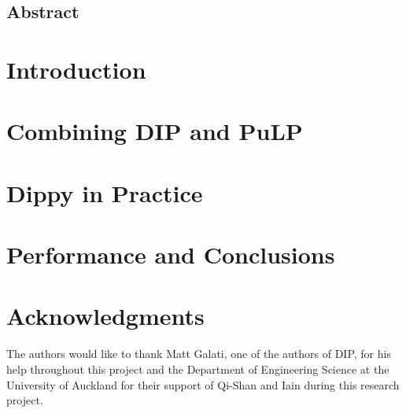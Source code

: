 \documentclass[12pt,a4paper,onecolumn,twoside]{article}
\begin{document}
\pagestyle{plain} \thispagestyle{empty}


\subsection*{Abstract}


\section{Introduction} \label{scn:intro}


\section{Combining \ac{DIP} and PuLP} \label{scn:overview}


\section{Dippy in Practice} \label{scn:techs}


\section{Performance and Conclusions} \label{scn:concl}


\newpage
\section{Acknowledgments}

The authors would like to thank Matt Galati, one of the authors of \ac{DIP}, for his help throughout this project and the Department of Engineering Science at the University of Auckland for their support of Qi-Shan and Iain during this research project.
\\
\\
\\
\vspace*{-0.5\baselineskip}
%
%


\end{document}
